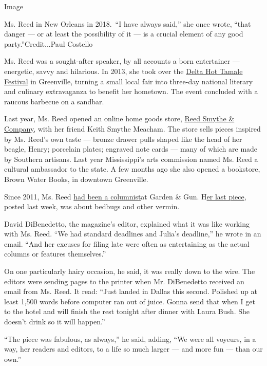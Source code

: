 Image

Ms. Reed in New Orleans in 2018.~``I have always said,'' she once wrote,
``that danger --- or at least the possibility of it --- is a crucial
element of any good party.''Credit...Paul Costello

Ms. Reed was a sought-after speaker, by all accounts a born entertainer
--- energetic, savvy and hilarious. In 2013, she took over the
\href{https://www.mainstreetgreenville.com/delta-hot-tamale-festival.html}{Delta
Hot Tamale Festival} in Greenville, turning a small local fair into
three-day national literary and culinary extravaganza to benefit her
hometown. The event concluded with a raucous barbecue on a sandbar.

Last year, Ms. Reed opened an online home goods store,
\href{https://www.reedsmythe.com}{Reed Smythe \& Company}, with her
friend Keith Smythe Meacham. The store sells pieces inspired by Ms.
Reed's own taste --- bronze drawer pulls shaped like the head of her
beagle, Henry; porcelain plates; engraved note cards --- many of which
are made by Southern artisans. Last year Mississippi's arts commission
named Ms. Reed a cultural ambassador to the state. A few months ago she
also opened a bookstore, Brown Water Books, in downtown Greenville.

Since 2011, Ms. Reed
\href{https://gardenandgun.com/feature/the-indelible-voice-of-julia-reed/}{had
been a columnist}at Garden \& Gun.
H\href{https://gardenandgun.com/articles/my-home-is-my-animal-kingdom/}{er
last piece}, posted last week, was about bedbugs and other vermin.

David DiBenedetto, the magazine's editor, explained what it was like
working with Ms. Reed. ``We had standard deadlines and Julia's
deadline,'' he wrote in an email. ``And her excuses for filing late were
often as entertaining as the actual columns or features themselves.''

On one particularly hairy occasion, he said, it was really down to the
wire. The editors were sending pages to the printer when Mr. DiBenedetto
received an email from Ms. Reed. It read: ``Just landed in Dallas this
second. Polished up at least 1,500 words before computer ran out of
juice. Gonna send that when I get to the hotel and will finish the rest
tonight after dinner with Laura Bush. She doesn't drink so it will
happen.''

``The piece was fabulous, as always,'' he said, adding, ``We were all
voyeurs, in a way, her readers and editors, to a life so much larger ---
and more fun --- than our own.''

